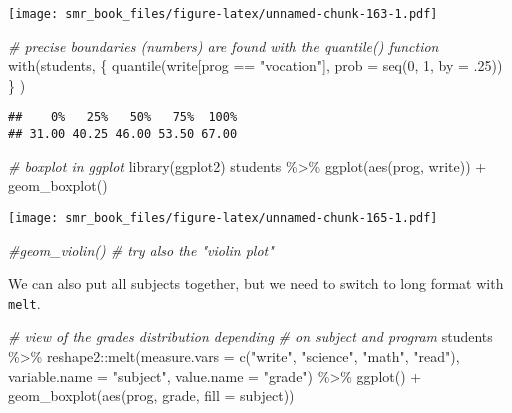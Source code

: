 \documentclass[
  oneside]{book}
\newenvironment{Shaded}{\begin{snugshade}}{\end{snugshade}}
\newcommand{\AttributeTok}[1]{\textcolor[rgb]{0.77,0.63,0.00}{#1}}
\newcommand{\CommentTok}[1]{\textcolor[rgb]{0.56,0.35,0.01}{\textit{#1}}}
\newcommand{\DecValTok}[1]{\textcolor[rgb]{0.00,0.00,0.81}{#1}}
\newcommand{\FunctionTok}[1]{\textcolor[rgb]{0.00,0.00,0.00}{#1}}
\newcommand{\NormalTok}[1]{#1}
\newcommand{\SpecialCharTok}[1]{\textcolor[rgb]{0.00,0.00,0.00}{#1}}
\newcommand{\StringTok}[1]{\textcolor[rgb]{0.31,0.60,0.02}{#1}}
\begin{document}
\texttt{[image: smr\_book\_files/figure-latex/unnamed-chunk-163-1.pdf]}

\begin{Shaded}
\begin{Highlighting}[]
\CommentTok{\# precise boundaries (numbers) are found with the \textasciigrave{}quantile()\textasciigrave{} function}
\FunctionTok{with}\NormalTok{(students, \{}
  \FunctionTok{quantile}\NormalTok{(write[prog }\SpecialCharTok{==} \StringTok{"vocation"}\NormalTok{], }\AttributeTok{prob =} \FunctionTok{seq}\NormalTok{(}\DecValTok{0}\NormalTok{, }\DecValTok{1}\NormalTok{, }\AttributeTok{by =}\NormalTok{ .}\DecValTok{25}\NormalTok{))}
\NormalTok{  \}}
\NormalTok{)}
\end{Highlighting}
\end{Shaded}

\begin{verbatim}
##    0%   25%   50%   75%  100% 
## 31.00 40.25 46.00 53.50 67.00
\end{verbatim}

\begin{Shaded}
\begin{Highlighting}[]
\CommentTok{\# boxplot in ggplot}
\FunctionTok{library}\NormalTok{(ggplot2)}
\NormalTok{students }\SpecialCharTok{\%\textgreater{}\%}
  \FunctionTok{ggplot}\NormalTok{(}\FunctionTok{aes}\NormalTok{(prog, write)) }\SpecialCharTok{+}
  \FunctionTok{geom\_boxplot}\NormalTok{()}
\end{Highlighting}
\end{Shaded}

\texttt{[image: smr\_book\_files/figure-latex/unnamed-chunk-165-1.pdf]}

\begin{Shaded}
\begin{Highlighting}[]
  \CommentTok{\#geom\_violin() \# try also the "violin plot"}
\end{Highlighting}
\end{Shaded}

We can also put all subjects together, but we need to
switch to long format with \texttt{melt}.

\begin{Shaded}
\begin{Highlighting}[]
\CommentTok{\# view of the grades distribution depending}
\CommentTok{\# on subject and program}
\NormalTok{students }\SpecialCharTok{\%\textgreater{}\%}
\NormalTok{  reshape2}\SpecialCharTok{::}\FunctionTok{melt}\NormalTok{(}\AttributeTok{measure.vars =} \FunctionTok{c}\NormalTok{(}\StringTok{"write"}\NormalTok{, }\StringTok{"science"}\NormalTok{, }\StringTok{"math"}\NormalTok{, }\StringTok{"read"}\NormalTok{),}
       \AttributeTok{variable.name =} \StringTok{"subject"}\NormalTok{,}
       \AttributeTok{value.name =} \StringTok{"grade"}\NormalTok{) }\SpecialCharTok{\%\textgreater{}\%}
  \FunctionTok{ggplot}\NormalTok{() }\SpecialCharTok{+}
    \FunctionTok{geom\_boxplot}\NormalTok{(}\FunctionTok{aes}\NormalTok{(prog, grade, }\AttributeTok{fill =}\NormalTok{ subject))}
\end{Highlighting}
\end{Shaded}
\end{document}
